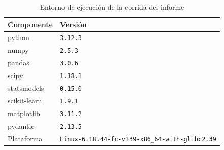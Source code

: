 \begin{table}[htbp]
\centering
\footnotesize
\caption{Entorno de ejecución de la corrida del informe}\label{tab:entorno}
\begin{tabularx}{\linewidth}{l >{\raggedright\arraybackslash}X}
\toprule
Componente & Versión \\
\midrule
python & \texttt{3.12.3} \\
numpy & \texttt{2.5.3} \\
pandas & \texttt{3.0.6} \\
scipy & \texttt{1.18.1} \\
statsmodels & \texttt{0.15.0} \\
scikit-learn & \texttt{1.9.1} \\
matplotlib & \texttt{3.11.2} \\
pydantic & \texttt{2.13.5} \\
Plataforma & \texttt{Linux-6.18.44-fc-v139-x86\_64-with-glibc2.39} \\
\bottomrule
\end{tabularx}

\end{table}
